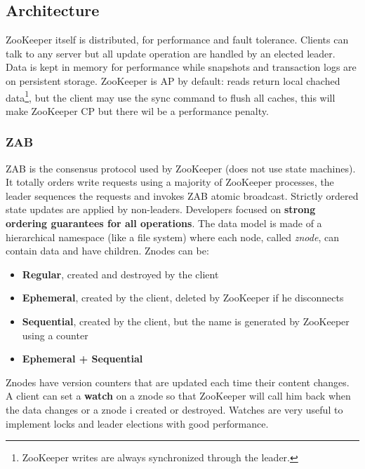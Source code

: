 	\subsection{Architecture}
		ZooKeeper itself is distributed, for performance and fault tolerance. Clients can talk to any server but all update operation are handled by an elected leader.\newline
		Data is kept in memory for performance while snapshots and transaction logs are on persistent storage.\newline
		\newline
		ZooKeeper is AP by default: reads return local chached data\footnote{ZooKeeper writes are always synchronized through the leader.}, but the client may use the sync command to flush all caches, this will make ZooKeeper CP but there wil be a performance penalty.
		\subsubsection{ZAB}
		ZAB is the consensus protocol used by ZooKeeper (does not use state machines). It totally orders write requests using a majority of ZooKeeper processes, the leader sequences the requests and invokes ZAB atomic broadcast. Strictly ordered state updates are applied by non-leaders.\newline
		Developers focused on \textbf{strong ordering guarantees for all operations}.\newline
		\newline
		The data model is made of a hierarchical namespace (like a file system) where each node, called \textit{znode}, can contain data and have children.\newline
		Znodes can be:
		\begin{itemize}
			\item \textbf{Regular}, created and destroyed by the client
			\item \textbf{Ephemeral}, created by the client, deleted by ZooKeeper if he disconnects
			\item \textbf{Sequential}, created by the client, but the name is generated by ZooKeeper using a counter
			\item \textbf{Ephemeral + Sequential}
		\end{itemize}
		Znodes have version counters that are updated each time their content changes. A client can set a \textbf{watch} on a znode so that ZooKeeper will call him back when the data changes or a znode i created or destroyed. Watches are very useful to implement locks and leader elections with good performance.
